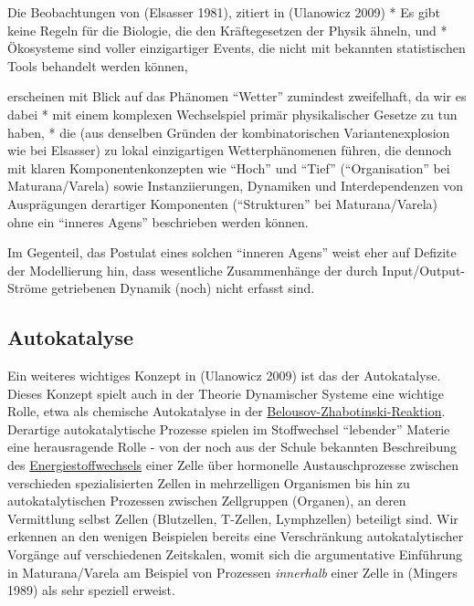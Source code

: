 \documentclass[11pt,a4paper]{article}
\begin{document}
Die Beobachtungen von (Elsasser 1981), zitiert in (Ulanowicz 2009) * Es
gibt keine Regeln für die Biologie, die den Kräftegesetzen der Physik
ähneln, und * Ökosysteme sind voller einzigartiger Events, die nicht mit
bekannten statistischen Tools behandelt werden können,

erscheinen mit Blick auf das Phänomen ``Wetter'' zumindest zweifelhaft,
da wir es dabei * mit einem komplexen Wechselspiel primär physikalischer
Gesetze zu tun haben, * die (aus denselben Gründen der kombinatorischen
Variantenexplosion wie bei Elsasser) zu lokal einzigartigen
Wetterphänomenen führen, die dennoch mit klaren Komponentenkonzepten wie
``Hoch'' und ``Tief'' (``Organisation'' bei Maturana/Varela) sowie
Instanziierungen, Dynamiken und Interdependenzen von Ausprägungen
derartiger Komponenten (``Strukturen'' bei Maturana/Varela) ohne ein
``inneres Agens'' beschrieben werden können.

Im Gegenteil, das Postulat eines solchen ``inneren Agens'' weist eher
auf Defizite der Modellierung hin, dass wesentliche Zusammenhänge der
durch Input/Output-Ströme getriebenen Dynamik (noch) nicht erfasst sind.

\hypertarget{autokatalyse}{%
\subsection{Autokatalyse}\label{autokatalyse}}

Ein weiteres wichtiges Konzept in (Ulanowicz 2009) ist das der
Autokatalyse. Dieses Konzept spielt auch in der Theorie Dynamischer
Systeme eine wichtige Rolle, etwa als chemische Autokatalyse in der
\href{https://de.wikipedia.org/wiki/Belousov-Zhabotinsky-Reaktion}{Belousov-Zhabotinski-Reaktion}.
Derartige autokatalytische Prozesse spielen im Stoffwechsel ``lebender''
Materie eine herausragende Rolle - von der noch aus der Schule bekannten
Beschreibung des
\href{https://de.wikipedia.org/wiki/Energiebereitstellung}{Energiestoffwechsels}
einer Zelle über hormonelle Austauschprozesse zwischen verschieden
spezialisierten Zellen in mehrzelligen Organismen bis hin zu
autokatalytischen Prozessen zwischen Zellgruppen (Organen), an deren
Vermittlung selbst Zellen (Blutzellen, T-Zellen, Lymphzellen) beteiligt
sind. Wir erkennen an den wenigen Beispielen bereits eine Verschränkung
autokatalytischer Vorgänge auf verschiedenen Zeitskalen, womit sich die
argumentative Einführung in Maturana/Varela am Beispiel von Prozessen
\emph{innerhalb} einer Zelle in (Mingers 1989) als sehr speziell
erweist.
\end{document}
